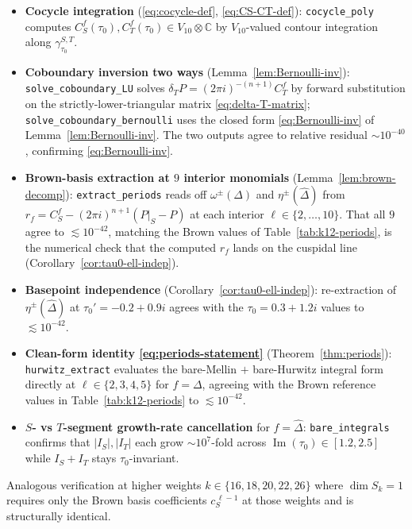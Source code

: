\documentclass[11pt]{article}
\numberwithin{equation}{section}  %
\newcommand{\CC}{\mathbb{C}}
\newcommand{\Dhat}{\widehat{\Delta}}
\DeclareMathOperator{\im}{Im}
\begin{document}
\begin{itemize}
\item \textbf{Cocycle integration} (\eqref{eq:cocycle-def},
\eqref{eq:CS-CT-def}): \texttt{cocycle\_poly} computes
$C^f_S(\tau_0), C^f_T(\tau_0) \in V_{10} \otimes \CC$ by $V_{10}$-valued
contour integration along $\gamma^{S,T}_{\tau_0}$.

\item \textbf{Coboundary inversion two ways} (Lemma~\ref{lem:Bernoulli-inv}):
\texttt{solve\_coboundary\_LU} solves $\delta_T P = (2\pi i)^{-(n + 1)} C^f_T$ by
forward substitution on the strictly-lower-triangular matrix
\eqref{eq:delta-T-matrix}; \texttt{solve\_coboundary\_bernoulli}
uses the closed form \eqref{eq:Bernoulli-inv} of
Lemma~\ref{lem:Bernoulli-inv}.  The two outputs agree to relative
residual $\sim 10^{-40}$, confirming \eqref{eq:Bernoulli-inv}.

\item \textbf{Brown-basis extraction at $9$ interior monomials}
(Lemma~\ref{lem:brown-decomp}): \texttt{extract\_periods} reads off
$\omega^\pm(\Delta)$ and $\eta^\pm(\Dhat)$ from
$r_f = C^f_S - (2\pi i)^{n + 1}(P|_S - P)$ at each interior
$\ell \in \{2, \ldots, 10\}$.  That all $9$ agree to $\lesssim 10^{-42}$,
matching the Brown values of Table~\ref{tab:k12-periods}, is the
numerical check that the computed $r_f$ lands on the cuspidal line
(Corollary~\ref{cor:tau0-ell-indep}).

\item \textbf{Basepoint independence}
(Corollary~\ref{cor:tau0-ell-indep}): re-extraction of
$\eta^\pm(\Dhat)$ at $\tau_0' = -0.2 + 0.9i$ agrees with the
$\tau_0 = 0.3 + 1.2i$ values to $\lesssim 10^{-42}$.

\item \textbf{Clean-form identity \eqref{eq:periods-statement}}
(Theorem~\ref{thm:periods}): \texttt{hurwitz\_extract} evaluates the
bare-Mellin $+$ bare-Hurwitz integral form directly at
$\ell \in \{2, 3, 4, 5\}$ for $f = \Delta$, agreeing with the Brown
reference values in Table~\ref{tab:k12-periods} to
$\lesssim 10^{-42}$.

\item \textbf{$S$- vs $T$-segment growth-rate cancellation} for
$f = \Dhat$: \texttt{bare\_integrals} confirms that $|I_S|, |I_T|$
each grow ${\sim}10^7$-fold across $\im(\tau_0) \in [1.2, 2.5]$ while
$I_S + I_T$ stays $\tau_0$-invariant.
\end{itemize}

Analogous verification at higher weights $k \in \{16, 18, 20, 22, 26\}$
where $\dim S_k = 1$ requires only the Brown basis coefficients
$c_S^{\,\ell - 1}$ at those weights and is structurally identical.
\end{document}
